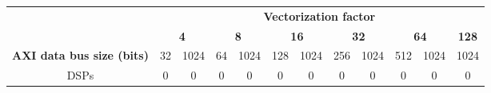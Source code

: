 \begin{tabular}{|c|c|c|c|c|c|c|c|c|c|c|c|}
\cline{2-12}
\multicolumn{1}{c|}{} & \multicolumn{11}{c|}{\textbf{Vectorization factor}} \\
\cline{2-12}
\multicolumn{1}{c|}{} & \multicolumn{2}{c|}{\textbf{4}} & \multicolumn{2}{c|}{\textbf{8}} & \multicolumn{2}{c|}{\textbf{16}} & \multicolumn{2}{c|}{\textbf{32}} & \multicolumn{2}{c|}{\textbf{64}} & \multicolumn{1}{c|}{\textbf{128}} \\
\hline
\multicolumn{1}{|c|}{\textbf{AXI data bus size (bits)}} & 32 & 1024 & 64 & 1024 & 128 & 1024 & 256 & 1024 & 512 & 1024 & 1024 \\
\hline
\multicolumn{1}{|c|}{DSPs} &  0 & 0 & 0 & 0 & 0 & 0 & 0 & 0 & 0 & 0 & 0 \\
\hline
\end{tabular}
